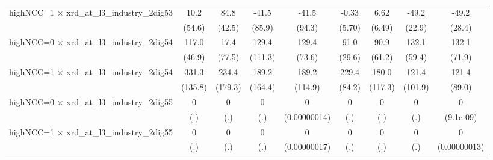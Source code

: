 {\begin{tabular}{l*{8}{c}}
\addlinespace
highNCC=1 $\times$ xrd\_at\_l3\_industry\_2dig53&        10.2         &        84.8\sym{**} &       -41.5         &       -41.5         &       -0.33         &        6.62         &       -49.2\sym{**} &       -49.2\sym{*}  \\
                    &      (54.6)         &      (42.5)         &      (85.9)         &      (94.3)         &      (5.70)         &      (6.49)         &      (22.9)         &      (28.4)         \\
\addlinespace
highNCC=0 $\times$ xrd\_at\_l3\_industry\_2dig54&       117.0\sym{**} &        17.4         &       129.4         &       129.4\sym{*}  &        91.0\sym{***}&        90.9         &       132.1\sym{**} &       132.1\sym{*}  \\
                    &      (46.9)         &      (77.5)         &     (111.3)         &      (73.6)         &      (29.6)         &      (61.2)         &      (59.4)         &      (71.9)         \\
\addlinespace
highNCC=1 $\times$ xrd\_at\_l3\_industry\_2dig54&       331.3\sym{**} &       234.4         &       189.2         &       189.2         &       229.4\sym{***}&       180.0         &       121.4         &       121.4         \\
                    &     (135.8)         &     (179.3)         &     (164.4)         &     (114.9)         &      (84.2)         &     (117.3)         &     (101.9)         &      (89.0)         \\
\addlinespace
highNCC=0 $\times$ xrd\_at\_l3\_industry\_2dig55&           0         &           0         &           0         &           0         &           0         &           0         &           0         &           0         \\
                    &         (.)         &         (.)         &         (.)         &(0.00000014)         &         (.)         &         (.)         &         (.)         &   (9.1e-09)         \\
\addlinespace
highNCC=1 $\times$ xrd\_at\_l3\_industry\_2dig55&           0         &           0         &           0         &           0         &           0         &           0         &           0         &           0         \\
                    &         (.)         &         (.)         &         (.)         &(0.00000017)         &         (.)         &         (.)         &         (.)         &(0.00000013)         \\

\end{tabular}}
